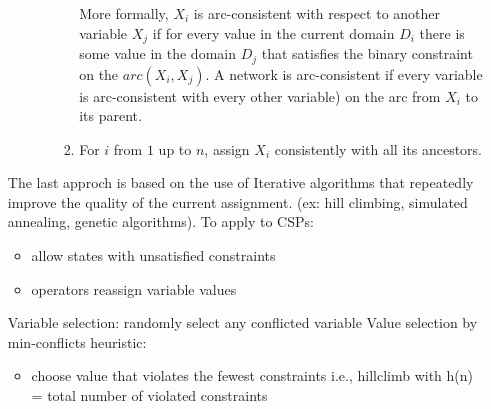 \documentclass[12pt]{article}
\begin{document}
\begin{enumerate}
\begin{itemize}
\begin{itemize}
\begin{enumerate}
                More formally, $X_i$ is arc-consistent with respect to another variable $X_j$ if for every value in the current domain $D_i$ there is some value in the domain $D_j$
                that satisfies the binary constraint on the $arc(X_i,X_j)$. 
                A network is arc-consistent if every variable is arc-consistent with every other variable) on the arc from $X_i$ to its parent.
                \item For $i$ from $1$ up to $n$, assign $X_i$ consistently with all its ancestors.
            \end{enumerate}
        \end{itemize}
    \end{itemize}

    The last approch is based on the use of Iterative algorithms that repeatedly improve the quality of the current assignment.
    (ex: hill climbing, simulated annealing, genetic algorithms).
    To apply to CSPs: 
    \begin{itemize}
        \item allow states with unsatisfied constraints
        \item operators reassign variable values
    \end{itemize}
    Variable selection: randomly select any conflicted variable 
    Value selection by min-conflicts heuristic: 
    \begin{itemize}
        \item choose value that violates the fewest constraints i.e., hillclimb with h(n) = total number of violated constraints
    \end{itemize}

\end{enumerate}
\end{document}
